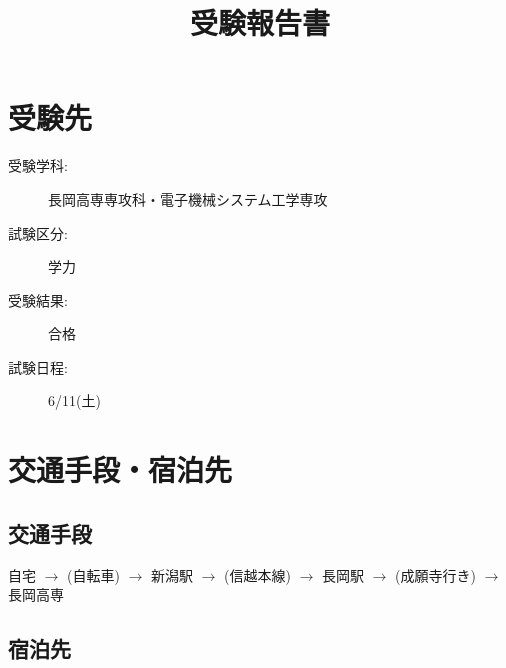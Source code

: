 \documentclass[dvipdfmx]{jsarticle}
\begin{document}
\title{受験報告書}
\author{} %
\date{}   %
\maketitle
\section{受験先}
\begin{description}
  \item[受験学科:] 長岡高専専攻科・電子機械システム工学専攻
  \item[試験区分:] 学力
  \item[受験結果:] 合格
  \item[試験日程:] 6/11(土)
\end{description}

\section{交通手段・宿泊先}

\subsection{交通手段}
自宅 $\rightarrow$ (自転車) $\rightarrow$ 新潟駅 $\rightarrow$ (信越本線)
$\rightarrow$ 長岡駅 $\rightarrow$ (成願寺行き) $\rightarrow$ 長岡高専


\subsection{宿泊先}
\end{document}
